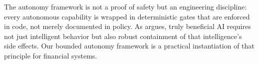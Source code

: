 The autonomy framework is not a proof of safety but an engineering discipline: every autonomous capability is wrapped in deterministic gates that are enforced in code, not merely documented in policy. As \citet{russell2020human} argues, truly beneficial AI requires not just intelligent behavior but also robust containment of that intelligence's side effects. Our bounded autonomy framework is a practical instantiation of that principle for financial systems.

